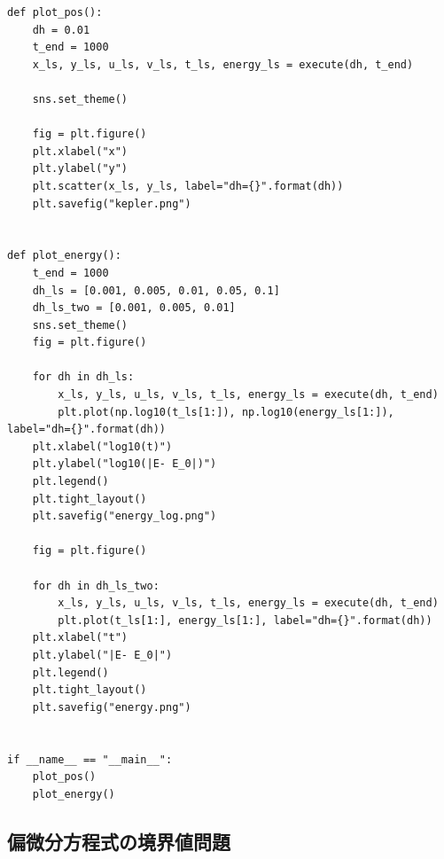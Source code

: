 \documentclass{jsarticle}
\begin{document}
\begin{lstlisting}[caption=エネルギー誤差の計算,label=参照ラベル]
def plot_pos():
    dh = 0.01
    t_end = 1000
    x_ls, y_ls, u_ls, v_ls, t_ls, energy_ls = execute(dh, t_end)

    sns.set_theme()

    fig = plt.figure()
    plt.xlabel("x")
    plt.ylabel("y")
    plt.scatter(x_ls, y_ls, label="dh={}".format(dh))
    plt.savefig("kepler.png")


def plot_energy():
    t_end = 1000
    dh_ls = [0.001, 0.005, 0.01, 0.05, 0.1]
    dh_ls_two = [0.001, 0.005, 0.01]
    sns.set_theme()
    fig = plt.figure()

    for dh in dh_ls:
        x_ls, y_ls, u_ls, v_ls, t_ls, energy_ls = execute(dh, t_end)
        plt.plot(np.log10(t_ls[1:]), np.log10(energy_ls[1:]), label="dh={}".format(dh))
    plt.xlabel("log10(t)")
    plt.ylabel("log10(|E- E_0|)")
    plt.legend()
    plt.tight_layout()
    plt.savefig("energy_log.png")

    fig = plt.figure()

    for dh in dh_ls_two:
        x_ls, y_ls, u_ls, v_ls, t_ls, energy_ls = execute(dh, t_end)
        plt.plot(t_ls[1:], energy_ls[1:], label="dh={}".format(dh))
    plt.xlabel("t")
    plt.ylabel("|E- E_0|")
    plt.legend()
    plt.tight_layout()
    plt.savefig("energy.png")


if __name__ == "__main__":
    plot_pos()
    plot_energy()
\end{lstlisting}
\subsection{偏微分方程式の境界値問題}
\end{document}
